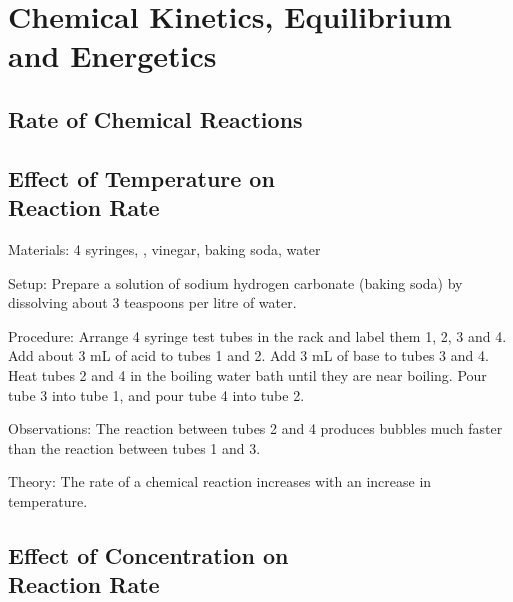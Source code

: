 \section{Chemical Kinetics, Equilibrium and Energetics}

\begin{multicols}{2}


\section*{Rate of Chemical Reactions}


\subsection[Effect of Temperature on Reaction Rate]{Effect of Temperature on \hfill \\ Reaction Rate}


\begin{description*}
\item[Materials:]{4 syringes, , vinegar, baking soda, water }
\item[Setup:]{Prepare a solution of sodium hydrogen carbonate (baking soda) by dissolving about 3 teaspoons per litre of water.}
\item[Procedure:]{Arrange 4 syringe test tubes in the rack and label them 1, 2, 3 and 4. Add about 3 mL of acid to tubes 1 and 2. Add 3 mL of base to tubes 3 and 4. Heat tubes 2 and 4 in the boiling water bath until they are near boiling. Pour tube 3 into tube 1, and pour tube 4 into tube 2.}
\item[Observations:]{The reaction between tubes 2 and 4 produces bubbles much faster than the reaction between tubes 1 and 3.}
\item[Theory:]{The rate of a chemical reaction increases with an increase in temperature.}
\end{description*}

\subsection[Effect of Concentration on Reaction Rate]{Effect of Concentration on \hfill \\ Reaction Rate}


\end{multicols}
